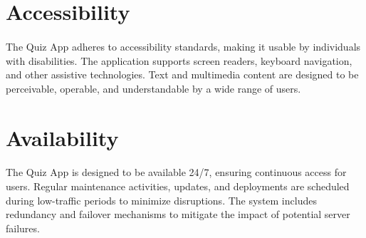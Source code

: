 \section{Accessibility}
\large{\paragraph{}
The Quiz App adheres to accessibility standards, making it usable by individuals with disabilities. The application supports screen readers, keyboard navigation, and other assistive technologies. Text and multimedia content are designed to be perceivable, operable, and understandable by a wide range of users.}

\section{Availability}
\large{\paragraph{}
The Quiz App is designed to be available 24/7, ensuring continuous access for users. Regular maintenance activities, updates, and deployments are scheduled during low-traffic periods to minimize disruptions. The system includes redundancy and failover mechanisms to mitigate the impact of potential server failures.}
